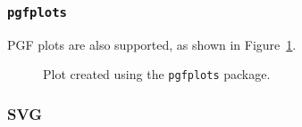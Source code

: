 


\subsubsection{\texttt{pgfplots}}
\label{demo:fig:pgf}

PGF plots are also supported, as shown in Figure~\ref{fig:sqrt}.

\begin{figure}[H]
    \centering
    \caption{Plot created using the \texttt{pgfplots} package.}
    \label{fig:sqrt}
\end{figure}

\subsubsection{SVG}

